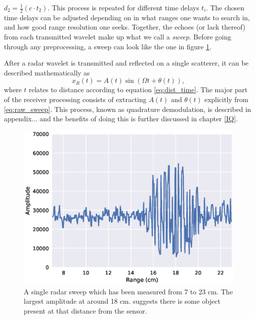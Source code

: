 $
	d_2 = \frac12(c\cdot t_2).
$
This process is repeated for different time delays $t_i$. The chosen time delays can be adjusted depending on in what ranges one wants to search in, and how good range resolution one seeks. Together, the echoes (or lack thereof) from each transmitted wavelet make up what we call a \textit{sweep}. Before going through any preprocessing, a sweep can look like the one in figure \ref{fig:single_sweep_raw}.

After a radar wavelet is transmitted and reflected on a single scatterer, it can be described mathematically as \citep{richards_2014}
\begin{equation}
	\label{eq:raw_sweep}
	x_R(t)=A(t)\sin(\Omega t +\theta (t)),
\end{equation}
where $t$ relates to distance according to equation \eqref{eq:dist_time}. The major part of the receiver processing consists of extracting $A(t)$ and $\theta(t)$ explicitly from \eqref{eq:raw_sweep}. This process, known as quadrature demodulation, is described in appendix... and the benefits of doing this is further discussed in chapter \ref{IQ}.

\begin{figure}[h]
	\centering
	\includegraphics[scale=0.8]{figs_temp/single_sweep_raw}
	\caption{A single radar sweep which has been measured from 7 to 23 cm. The largest amplitude at around 18 cm. suggests there is some object present at that distance from the sensor.}
	\label{fig:single_sweep_raw}
\end{figure}


